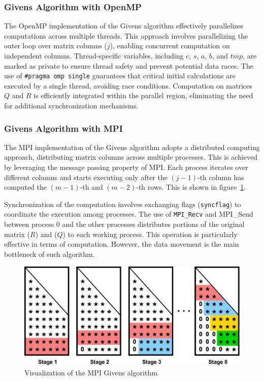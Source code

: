 \documentclass{article}
\begin{document}
\subsubsection{Givens Algorithm with OpenMP}

The OpenMP implementation of the Givens algorithm effectively parallelizes computations across multiple threads. This approach involves parallelizing the outer loop over matrix columns (\(j\)), enabling concurrent computation on independent columns. Thread-specific variables, including \(c\), \(s\), \(a\), \(b\), and \(tmp\), are marked as private to ensure thread safety and prevent potential data races. The use of \texttt{\#pragma omp single} guarantees that critical initial calculations are executed by a single thread, avoiding race conditions. Computation on matrices \(Q\) and \(R\) is efficiently integrated within the parallel region, eliminating the need for additional synchronization mechanisms.

\subsubsection{Givens Algorithm with MPI}

The MPI implementation of the Givens algorithm adopts a distributed computing approach, distributing matrix columns across multiple processes. This is achieved by leveraging the message passing property of MPI. Each process iterates over different columns and starts executing only after the \((j-1)\)-th column has computed the \((m-1)\)-th and \((m-2)\)-th rows. This is shown in figure~\ref{fig:mpi_givens}.

Synchronization of the computation involves exchanging flags (\texttt{syncflag}) to coordinate the execution among processes. The use of \texttt{MPI\_Recv} and {MPI\_Send} between process 0 and the other processes distributes portions of the original matrix (\(R\)) and (\(Q\)) to each working process. This operation is particularly effective in terms of computation. However, the data movement is the main bottleneck of such algorithm.

\begin{figure}[h]
    \centering
    \includegraphics[width=0.8\linewidth]{Applying-Givens-rotations-in-parallel.png}
    \caption{Visualization of the MPI Givens algorithm.}
    \label{fig:mpi_givens}
\end{figure}
\end{document}
